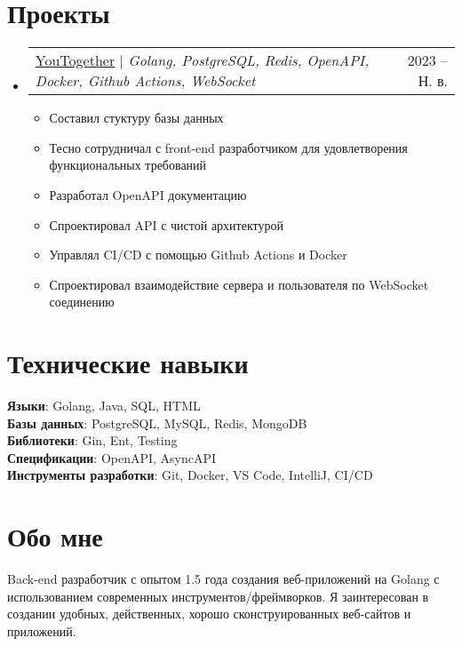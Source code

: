 \documentclass[letterpaper,11pt]{article}
\makeatletter
\newcommand{\resumeItem}[1]{
  \item\small{
    {#1 \vspace{-2pt}}
  }
}
\newcommand{\resumeProjectHeading}[2]{
    \item
    \begin{tabular*}{0.97\textwidth}{l@{\extracolsep{\fill}}r}
      \small#1 & #2 \\
    \end{tabular*}\vspace{-7pt}
}
\newcommand{\resumeSubHeadingListStart}{\begin{itemize}[leftmargin=0.15in, label={}]}
\newcommand{\resumeSubHeadingListEnd}{\end{itemize}}
\newcommand{\resumeItemListStart}{\begin{itemize}}
\newcommand{\resumeItemListEnd}{\end{itemize}\vspace{-5pt}}
\makeatother
\begin{document}
\section{Проекты}
\resumeSubHeadingListStart
\resumeProjectHeading
{\href{https://github.com/youtogether-online}{\underline{YouTogether}} $|$ \emph{Golang, PostgreSQL, Redis, OpenAPI, Docker, Github Actions, WebSocket}}{2023 -- Н. в.}
\resumeItemListStart
\resumeItem{Составил стуктуру базы данных}
\resumeItem{Тесно сотрудничал с front-end разработчиком для удовлетворения функциональных требований}
\resumeItem{Разработал OpenAPI документацию}
\resumeItem{Спроектировал API с чистой архитектурой}
\resumeItem{Управлял CI/CD с помощью Github Actions и Docker}
\resumeItem{Спроектировал взаимодействие сервера и пользователя по WebSocket соединению}
\resumeItemListEnd
\resumeSubHeadingListEnd

\section{Технические навыки}
\begin{itemize}[leftmargin=0.15in, label={}]
	\small{\item{
		\textbf{Языки}{: Golang, Java, SQL, HTML} \\
		\textbf{Базы данных}{: PostgreSQL, MySQL, Redis, MongoDB} \\
		\textbf{Библиотеки}{: Gin, Ent, Testing} \\
		\textbf{Спецификации}{: OpenAPI, AsyncAPI} \\
		\textbf{Инструменты разработки}{: Git, Docker, VS Code, IntelliJ, CI/CD} \\
	}}
\end{itemize}

\section{Обо мне}
\begin{itemize}[leftmargin=0.15in, label={}]
\small{\item{Back-end разработчик с опытом 1.5 года создания веб-приложений на Golang с использованием современных инструментов/фреймворков. Я заинтересован в создании удобных, действенных, хорошо сконструированных веб-сайтов и приложений.} \
}
\end{itemize}

\end{document}
